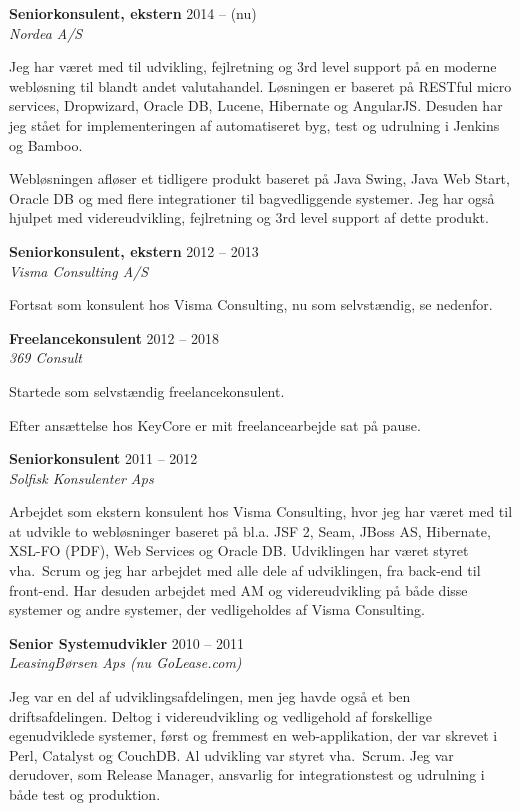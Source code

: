\documentclass[a4paper,11pt]{article}
\begin{document}
\smallskip

\textbf{Seniorkonsulent, ekstern} \hfill 2014 -- (nu) \\
\textsl{Nordea A/S}

Jeg har været med til udvikling, fejlretning og 3rd level support på
en moderne webløsning til blandt andet valutahandel. Løsningen er
baseret på RESTful micro services, Dropwizard, Oracle DB, Lucene,
Hibernate og AngularJS. Desuden har jeg stået for implementeringen af
automatiseret byg, test og udrulning i Jenkins og Bamboo.

Webløsningen afløser et tidligere produkt baseret på Java Swing, Java
Web Start, Oracle DB og med flere integrationer til bagvedliggende
systemer. Jeg har også hjulpet med videreudvikling, fejlretning og 3rd
level support af dette produkt.

\smallskip

\textbf{Seniorkonsulent, ekstern} \hfill 2012 -- 2013 \\
\textsl{Visma Consulting A/S}

Fortsat som konsulent hos Visma Consulting, nu som selvstændig, se
nedenfor.

\smallskip

\textbf{Freelancekonsulent} \hfill 2012 -- 2018 \\
\textsl{369 Consult}

Startede som selvstændig freelancekonsulent.

Efter ansættelse hos KeyCore er mit freelancearbejde sat på pause.


\smallskip

\textbf{Seniorkonsulent} \hfill 2011 -- 2012 \\
\textsl{Solfisk Konsulenter Aps}

Arbejdet som ekstern konsulent hos Visma Consulting, hvor jeg har
været med til at udvikle to webløsninger baseret på bl.a. JSF 2, Seam,
JBoss AS, Hibernate, XSL-FO (PDF), Web Services og Oracle
DB. Udviklingen har været styret vha.\ Scrum og jeg har arbejdet med
alle dele af udviklingen, fra back-end til front-end.  Har desuden
arbejdet med AM og videreudvikling på både disse systemer og andre
systemer, der vedligeholdes af Visma Consulting.

\smallskip

\textbf{Senior Systemudvikler} \hfill 2010 -- 2011 \\
\textsl{LeasingBørsen Aps (nu GoLease.com)}

Jeg var en del af udviklingsafdelingen, men jeg havde også et ben
driftsafdelingen. Deltog i videreudvikling og vedligehold af
forskellige egenudviklede systemer, først og fremmest en
web-applikation, der var skrevet i Perl, Catalyst og CouchDB.  Al
udvikling var styret vha.\ Scrum. Jeg var derudover, som Release
Manager, ansvarlig for integrationstest og udrulning i både test og
produktion.
\end{document}
